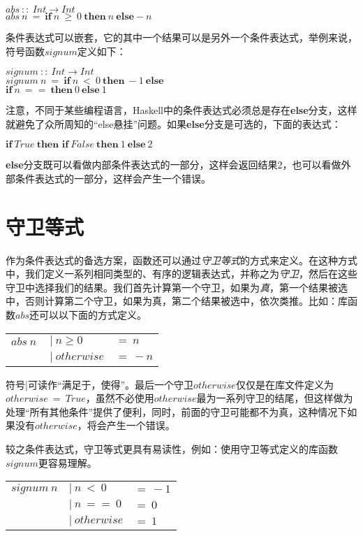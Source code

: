 \noindent\hspace*{1cm}$abs~::~Int \rightarrow Int$\\
\hspace*{1cm}$abs~n~=~\textbf{if}~n~ \geq ~0~ \textbf{then}~n~ \textbf{else} -n $

条件表达式可以嵌套，它的其中一个结果可以是另外一个条件表达式，举例来说，符号函数$signum$定义如下：

\noindent\hspace*{1cm}$signum~::~Int \rightarrow Int$\\
\hspace*{1cm}$signum~n~=~\textbf{if}~n~<~0~\textbf{then}~-1~\textbf{else} $\\
\hspace*{4cm}$\textbf{if}~n~==~\textbf{then}~0~\textbf{else}~1$

注意，不同于某些编程语言，Haskell中的条件表达式必须总是存在{\bf{else}}分支，这样就避免了众所周知的“else悬挂”问题。如果\textbf{else}分支是可选的，下面的表达式：

$\textbf{if}~True~\textbf{then~if}~False~\textbf{then}~1~\textbf{else}~2$

\textbf{else}分支既可以看做内部条件表达式的一部分，这样会返回结果2，也可以看做外部条件表达式的一部分，这样会产生一个错误。
\section{守卫等式}
作为条件表达式的备选方案，函数还可以通过\textit{守卫等式}的方式来定义。在这种方式中，我们定义一系列相同类型的、有序的逻辑表达式，并称之为\textit{守卫}，然后在这些守卫中选择我们的结果。我们首先计算第一个守卫，如果为\textit{真}，第一个结果被选中，否则计算第二个守卫，如果为真，第二个结果被选中，依次类推。比如：库函数$abs$还可以以下面的方式定义。

\begin{tabular}[t]{lll}
$abs~n~$&$|~n\geq 0$&$= ~ n$\\
&$|~otherwise$&$=~-n$\\
\end{tabular}

符号|可读作“满足于，使得”。最后一个守卫$otherwise$仅仅是在库文件定义为$otherwise~=~True$，虽然不必使用$otherwise$最为一系列守卫的结尾，但这样做为处理“所有其他条件”提供了便利，同时，前面的守卫可能都不为真，这种情况下如果没有$otherwise$，将会产生一个错误。

较之条件表达式，守卫等式更具有易读性，例如：使用守卫等式定义的库函数$signum$更容易理解。


\begin{tabular}[t]{lll}
$signum~n$&$|~n~<~0$&$=~-1$\\
&$|~n~==~0$&$=~0$\\
&$|~otherwise$&$=~1$\\
\end{tabular}

